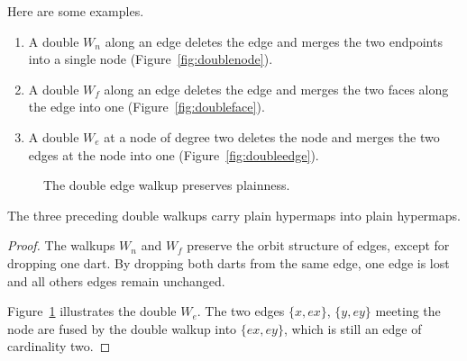 Here are some examples.
\begin{enumerate}\wasitemize 
\item A double $W_n$ along an edge deletes the edge and merges the two
  endpoints into a single node (Figure~\ref{fig:doublenode}).
\item A double $W_f$ along an edge deletes the edge and merges the two
  faces along the edge into one (Figure~\ref{fig:doubleface}).
\item A double $W_e$ at a node of degree two deletes the node and
  merges the two edges at the node into one
  (Figure~\ref{fig:doubleedge}).
\end{enumerate}\wasitemize 

\figYKJFZEB %


\figRVNJBTK %



\figCBQQAKM %



\begin{figure}[htb]
\centering
{}
\caption{The double edge walkup preserves plainness.}
\label{fig:doubleplain}
\end{figure}


\begin{lemma}\label{lemma:dwalk-planar}  
The three preceding double walkups carry plain
hypermaps into plain hypermaps.
\end{lemma}
%

\begin{proof} The walkups $W_n$ and $W_f$ preserve the orbit structure
  of edges, except for dropping one dart.  By dropping both darts from
  the same edge, one edge is lost and all others edges remain
  unchanged.

  Figure~\ref{fig:doubleplain} illustrates the double $W_e$.  The two
  edges $\{x,e x\}$, $\{y, e y\}$ meeting the node are fused by the
  double walkup into $\{e x, e y\}$, which is still an edge of cardinality
  two.
\end{proof}



